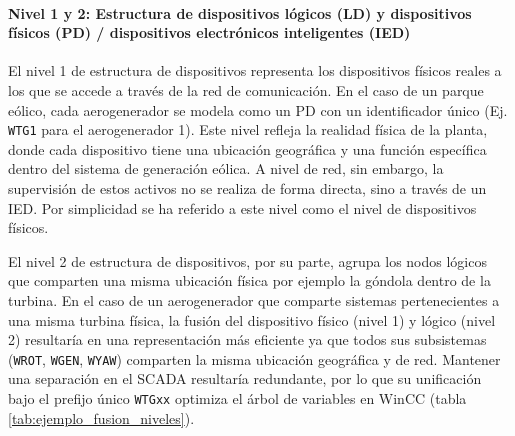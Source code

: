 \paragraph{Nivel 1 y 2: Estructura de dispositivos lógicos (LD) y dispositivos físicos (PD) / dispositivos electrónicos inteligentes (IED)}
El nivel 1 de estructura de dispositivos representa los dispositivos físicos reales a los que se accede a través de la red de comunicación. En el caso de un parque eólico, cada aerogenerador se modela como un \ac{PD} con un identificador único (Ej. \texttt{WTG1} para el aerogenerador 1). Este nivel refleja la realidad física de la planta, donde cada dispositivo tiene una ubicación geográfica y una función específica dentro del sistema de generación eólica. A nivel de red, sin embargo, la supervisión de estos activos no se realiza de forma directa, sino a través de un \ac{IED}. Por simplicidad se ha referido a este nivel como el nivel de dispositivos físicos. \par

El nivel 2 de estructura de dispositivos, por su parte, agrupa los nodos lógicos que comparten una misma ubicación física por ejemplo la góndola dentro de la turbina. En el caso de un aerogenerador que comparte sistemas pertenecientes a una misma turbina física, la fusión del dispositivo físico (nivel 1) y lógico (nivel 2) resultaría en una representación más eficiente ya que todos sus subsistemas (\texttt{WROT}, \texttt{WGEN}, \texttt{WYAW}) comparten la misma ubicación geográfica y de red. Mantener una separación en el \ac{SCADA} resultaría redundante, por lo que su unificación bajo el prefijo único \texttt{WTGxx} optimiza el árbol de variables en WinCC (tabla \ref{tab:ejemplo_fusion_niveles}).

\begin{table}[tb]
    \centering
    \caption{Correspondencia redundante de los niveles 1 y 2 para múltiples aerogeneradores en el parque.}
    \label{tab:redundancia_niveles_wtg}
\end{table}
\FloatBarrier
